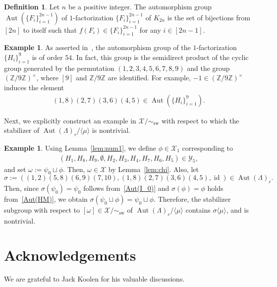 \documentclass[reqno, 11pt]{amsart}
\numberwithin{equation}{section}
\theoremstyle{definition}
\newtheorem{dfn}[lem]{Definition}%
\newtheorem{example}[lem]{Example}%
\DeclareMathOperator{\Aut}{Aut}
\DeclareMathOperator{\id}{id}
\DeclareMathOperator{\sw}{sw}
\newcommand{\cY}{\mathcal{Y}}
\newcommand{\aes}{\omega}
\newcommand{\aeso}{\phi}
\newcommand{\aesf}{\psi}
\newcommand{\cX}{\mathcal{X}}
\newcommand{\Z}{\mathbb{Z}}
\newcommand{\sr}{ r } %
\begin{document}
\begin{dfn}
	Let $n$ be a positive integer.
	The automorphism group $\Aut(\{ F_i \}_{i=1}^{2n-1})$ of $1$-factorization $\{ F_i \}_{i=1}^{2n-1}$ of $K_{2n}$ is the set of bijections from $[2n]$ to itself such that $f(F_i) \in \{ F_i \}_{i=1}^{2n-1}$ for any $i \in[2n-1]$.
\end{dfn}

\begin{example}
As asserted in~\cite[5.55]{handbook}, the automorphism group of the $1$-factorization $\{H_i\}_{i=1}^9$ is of order $54$.
In fact, this group is the semidirect product of the cyclic group generated by the permutation $(1,2,3,4,5,6,7,8,9)$ and the group $(\Z/9\Z)^\times$, where $[9]$ and $\Z/9\Z$ are identified.
For example, $-1 \in (\Z/9\Z)^{\times}$ induces the element 
\begin{align}	\label{Aut(HM)}
	(1,8)(2,7)(3,6)(4,5) \in \Aut(\{ H_i \}_{i=1}^9).
\end{align}
\end{example}

Next, we explicitly construct an example in $\cX/\sim_{\sw}$ with respect to which the stabilizer of $\Aut(\Lambda)_{\sr}/\langle \mu \rangle$ is nontrivial.
\begin{example}	\label{ex:non-trivial}
	Using Lemma~\ref{lem:num1}, we define $\aeso \in \cX_1$ corresponding to
	\begin{align*}
		(H_1,H_8,H_9,\emptyset, H_2,H_3,H_4,H_7,H_6,H_5 ) \in \cY_{5},
	\end{align*}
	and set $\aes := \aesf_0 \sqcup \aeso$.
	Then, $\aes \in \cX$ by Lemma~\ref{lem:chi}.
	Also, let $$\sigma := \left( (1,2)(5,8)(6,9)(7,10) , (1,8)(2,7)(3,6)(4,5), \id \right) \in \Aut(\Lambda)_{r}.$$
	Then, since $\sigma(\aesf_0) = \aesf_0$ follows from~\eqref{Aut(I_0)} and $\sigma(\aeso) = \aeso$ holds from~\eqref{Aut(HM)},
	we obtain $\sigma(\aesf_0 \sqcup \aeso) = \aesf_0 \sqcup \aeso$.
	Therefore, the stabilizer subgroup with respect to $[\omega] \in \cX/\sim_{\sw}$ of $\Aut(\Lambda)_{\sr}/\langle \mu \rangle$ contains $\sigma \langle \mu \rangle$, and is nontrivial.
\end{example}

\section*{Acknowledgements}
We are grateful to Jack Koolen for his valuable discussions.


\end{document}
